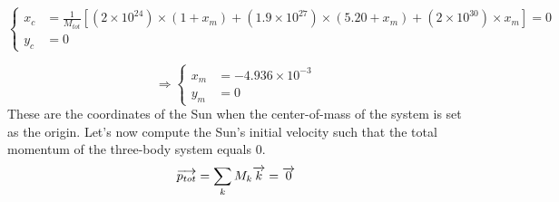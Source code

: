 \documentclass[a4paper, twoside, 11pt]{report}
\theoremstyle{theorem}
\theoremstyle{remark}
\theoremstyle{exemple}
\begin{document}
                \begin{equation*}
                    \left\{
                        \begin{aligned}
                            x_c &= \frac{1}{M_{tot}} [(2 \times 10^{24}) \times (1 + x_m) + (1.9 \times 10^{27}) \times (5.20 + x_m) + (2 \times 10^{30}) \times x_m] = 0 \\
                            y_c &= 0 
                        \end{aligned}
                    \right.
                \end{equation*}
                
                \begin{equation*}
                    \Longrightarrow \left\{ 
                        \begin{aligned}
                            x_m &= -4.936 \times 10^{-3}\\
                            y_m &= 0
                        \end{aligned}
                    \right.
                    \tag{5}
                \end{equation*}
            These are the coordinates of the Sun when the center-of-mass of the system is set as the origin. Let's now compute the Sun's initial velocity such that the total momentum of the three-body system equals 0.
                \begin{equation}
                    \overrightarrow{p_{tot}} = \sum\limits_{k} M_k \overrightarrow{k} = \overrightarrow{0} \\
                \end{equation}
                
\end{document}

